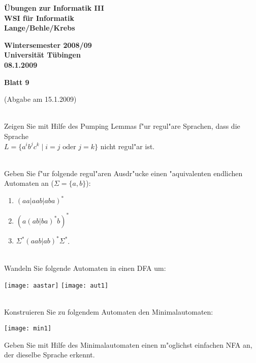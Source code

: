 \documentclass[a4paper]{article}
\def\header#1#2#3{\pagestyle{empty}
\noindent
\begin{minipage}[t]{0.6\textwidth}
\begin{flushleft}
\bf \"Ubungen zur Informatik III\\
WSI f\"ur Informatik\\
Lange/Behle/Krebs
\end{flushleft}
\end{minipage}
\begin{minipage}[t]{0.4\textwidth}
\begin{flushright}
\bf Wintersemester 2008/09\\
Universit\"at T\"ubingen\\
#2 %
\end{flushright}
\end{minipage}

\begin{center}
{\Large\bf Blatt #1}

{(Abgabe am #3)}
\end{center}
\bigskip
}
\begin{document}
\header{9}{08.1.2009}{15.1.2009}

\bigskip
{}\\
Zeigen Sie mit Hilfe des Pumping Lemmas f"ur regul"are Sprachen, dass die Sprache\\ $L=\{a^ib^jc^k\mid i=j\mbox{ oder }j=k\}$ nicht regul"ar ist.

\bigskip
{}\\
Geben Sie f"ur folgende regul"aren Ausdr"ucke einen "aquivalenten endlichen Automaten an ($\Sigma=\{a,b\}$):
\begin{enumerate}
\item $(aa|aab|aba)^*$
\item $(a(ab|ba)^*b)^*$
\item $\Sigma^*(aab|ab)^*\Sigma^*$.
\end{enumerate}


\bigskip
{}\\
Wandeln Sie folgende Automaten in einen DFA um:
\begin{center}
\texttt{[image: aastar]}\hspace{3cm}
\texttt{[image: aut1]}
\end{center}

\bigskip
{}\\
Konstruieren Sie zu folgendem Automaten den Minimalautomaten:
\begin{center}
\texttt{[image: min1]}
\end{center}
Geben Sie mit Hilfe des Minimalautomaten einen m"oglichst einfachen NFA an, der dieselbe Sprache erkennt.
\end{document}

